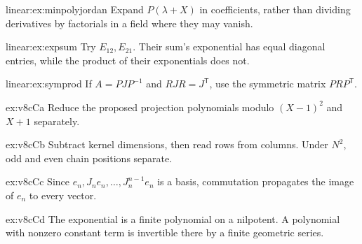 \begin{hint}{linear:ex:minpolyjordan}
Expand $P(\lambda+X)$ in coefficients, rather than dividing derivatives by factorials in a field where they may vanish.
\end{hint}
\begin{hint}{linear:ex:expsum}
Try $E_{12},E_{21}$. Their sum's exponential has equal diagonal entries, while the product of their exponentials does not.
\end{hint}
\begin{hint}{linear:ex:symprod}
If $A=PJP^{-1}$ and $RJR=J^{\mathsf T}$, use the symmetric matrix $PRP^{\mathsf T}$.
\end{hint}
\begin{hint}{ex:v8cCa}
Reduce the proposed projection polynomials modulo $(X-1)^2$ and $X+1$ separately.
\end{hint}
\begin{hint}{ex:v8cCb}
Subtract kernel dimensions, then read rows from columns. Under $N^2$, odd and even chain positions separate.
\end{hint}
\begin{hint}{ex:v8cCc}
Since $e_n,J_ne_n,\ldots,J_n^{n-1}e_n$ is a basis, commutation propagates the image of $e_n$ to every vector.
\end{hint}
\begin{hint}{ex:v8cCd}
The exponential is a finite polynomial on a nilpotent. A polynomial with nonzero constant term is invertible there by a finite geometric series.
\end{hint}

